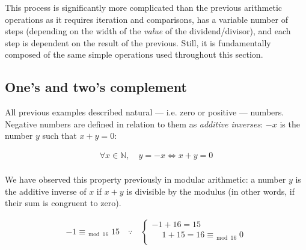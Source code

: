 This process is significantly more complicated than the previous arithmetic
operations as it requires iteration and comparisons, has a variable number of
steps (depending on the width of the \emph{value} of the dividend/divisor), and
each step is dependent on the result of the previous.  Still, it is
fundamentally composed of the same simple operations used throughout this
section.

\subsection{One's and two's complement}

\label{subsec:arch:ones_twos_comp}

All previous examples described natural --- i.e. zero or positive --- numbers.
Negative numbers are defined in relation to them as \textit{additive inverses}:
$-x$ is the number $y$ such that $x + y = 0$:

\begin{align*}
    \forall x \in \mathbb{N}, \quad y = -x \iff x + y = 0 \\
\end{align*}

We have observed this property previously in modular arithmetic: a number $y$ is
the additive inverse of $x$ if $x + y$ is divisible by the modulus (in other
words, if their sum is congruent to zero)\footnotemark.


\begin{align*}
    -1 \equiv_{\bmod{16}} 15
    \quad \because \quad
    \begin{cases}
                 - 1 + 16 = 15 \\
        \phantom{-}1 + 15 = 16 \equiv_{\bmod{16}} 0 \\
    \end{cases} \\
\end{align*}


